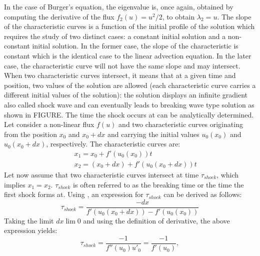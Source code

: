 In the case of Burger's equation, the eigenvalue is, once again, obtained by computing the derivative of the flux $f_2(u) = u^2/2$, to obtain $\lambda_2 = u$. The slope of the characteristic curves is a function of the initial profile of the solution which requires the study of two distinct cases: a constant initial solution and a non-constant initial solution. In the former case, the slope of the characteristic is constant which is the identical case to the linear advection equation. In the later case, the characteristic curve will not have the same slope and may intersect. When two characteristic curves intersect, it means that at a given time and position, two values of the solution are allowed (each characteristic curve carries a different initial values of the solution): the solution displays an infinite gradient also called shock wave and can eventually leads to breaking wave type solution as shown in FIGURE. The time the shock occurs at can be analytically determined. Let consider a non-linear flux $f(u)$ and two characteristic curves originating from the position $x_0$ and $x_0+dx$ and carrying the initial values $u_0(x_0)$ and $u_0(x_0+dx)$, respectively. The characteristic curves are:
%
\begin{eqnarray}\label{eq:cc1_sct1b}
&&x_1 = x_0 + f'(u_0(x_0)) t \nonumber \\ 
&&x_2 = (x_0 + dx) + f'(u_0(x_0+dx)) t \nonumber 
\end{eqnarray}
%
Let now assume that two characteristic curves intersect at time $\tau_{shock}$, which implies $x_1 = x_2$. $\tau_{shock}$ is often referred to as the breaking time or the time the first shock forms at. Using , an expression for $\tau_{shock}$ can be derived as follows: 
\begin{equation}
\tau_{shock} = \frac{-dx}{f'(u_0(x_0+dx))-f'(u_0(x_0))}
\end{equation} 
Taking the limit $dx \lim 0$ and using the definition of derivative, the above expression yields:
\begin{equation}\label{eq:cc2_sct1b}
\tau_{shock} = \frac{-1}{f''(u_0) u'_0} = \frac{-1}{f'(u_0)},
\end{equation} 
